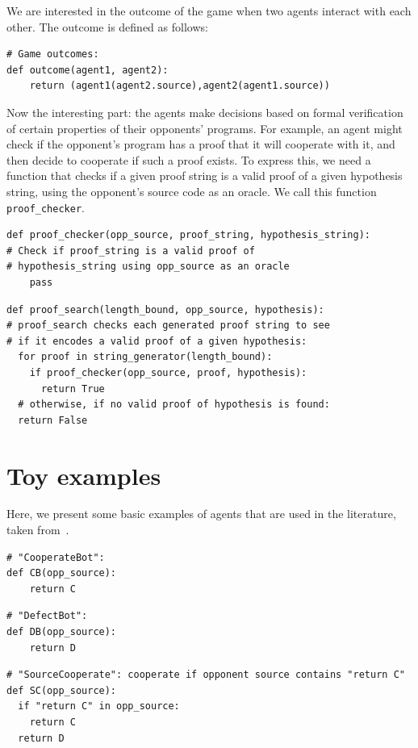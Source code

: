 \documentclass{article}
\begin{document}
We are interested in the outcome of the game when two agents interact with each other. The outcome is defined as follows:

\begin{verbatim}
# Game outcomes:
def outcome(agent1, agent2):
    return (agent1(agent2.source),agent2(agent1.source))
\end{verbatim}

Now the interesting part: the agents make decisions based on formal verification of certain properties of their opponents' programs. For example, an agent might check if the opponent's program has a proof that it will cooperate with it, and then decide to cooperate if such a proof exists.
To express this, we need a function that checks if a given proof string is a valid proof of a given hypothesis string, using the opponent's source code as an oracle. We call this function \texttt{proof\_checker}.

\begin{verbatim}
def proof_checker(opp_source, proof_string, hypothesis_string):
# Check if proof_string is a valid proof of
# hypothesis_string using opp_source as an oracle
    pass
\end{verbatim}

\begin{verbatim}
def proof_search(length_bound, opp_source, hypothesis):
# proof_search checks each generated proof string to see
# if it encodes a valid proof of a given hypothesis:
  for proof in string_generator(length_bound):
    if proof_checker(opp_source, proof, hypothesis):
      return True
  # otherwise, if no valid proof of hypothesis is found:
  return False
\end{verbatim}

\section{Toy examples}
Here, we present some basic examples of agents that are used in the literature, taken from~\textcite{critch2022cooperativeuncooperativeinstitutiondesigns}.
\begin{verbatim}
# "CooperateBot":
def CB(opp_source):
    return C
\end{verbatim}

\begin{verbatim}
# "DefectBot":
def DB(opp_source):
    return D
\end{verbatim}

\begin{verbatim}
# "SourceCooperate": cooperate if opponent source contains "return C"
def SC(opp_source):
  if "return C" in opp_source:
    return C
  return D
\end{verbatim}
\end{document}
